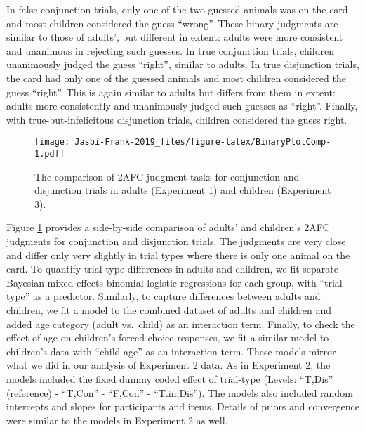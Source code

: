 \documentclass[,man,floatsintext]{apa6}
\begin{document}
In false conjunction trials, only one of the two guessed animals was on the card and most children considered the guess \enquote{wrong}. These binary judgments are similar to those of adults', but different in extent: adults were more consistent and unanimous in rejecting such guesses. In true conjunction trials, children unanimously judged the guess \enquote{right}, similar to adults. In true disjunction trials, the card had only one of the guessed animals and most children considered the guess \enquote{right}. This is again similar to adults but differs from them in extent: adults more consistently and unanimously judged such guesses as \enquote{right}. Finally, with true-but-infelicitous disjunction trials, children considered the guess right.

\begin{figure}
\centering
\texttt{[image: Jasbi-Frank-2019\_files/figure-latex/BinaryPlotComp-1.pdf]}
\caption{\label{fig:BinaryPlotComp}The comparison of 2AFC judgment tasks for conjunction and disjunction trials in adults (Experiment 1) and children (Experiment 3).}
\end{figure}

Figure \ref{fig:BinaryPlotComp} provides a side-by-side comparison of adults' and children's 2AFC judgments for conjunction and disjunction trials. The judgments are very close and differ only very slightly in trial types where there is only one animal on the card. To quantify trial-type differences in adults and children, we fit separate Bayesian mixed-effects binomial logistic regressions for each group, with \enquote{trial-type} as a predictor. Similarly, to capture differences between adults and children, we fit a model to the combined dataset of adults and children and added age category (adult vs.~child) as an interaction term. Finally, to check the effect of age on children's forced-choice responses, we fit a similar model to children's data with \enquote{child age} as an interaction term. These models mirror what we did in our analysis of Experiment 2 data. As in Experiment 2, the models included the fixed dummy coded effect of trial-type (Levels: \enquote{T,Dis} (reference) - \enquote{T,Con} - \enquote{F,Con} - \enquote{T.in,Dis}). The models also included random intercepts and slopes for participants and items. Details of priors and convergence were similar to the models in Experiment 2 as well.
\end{document}

